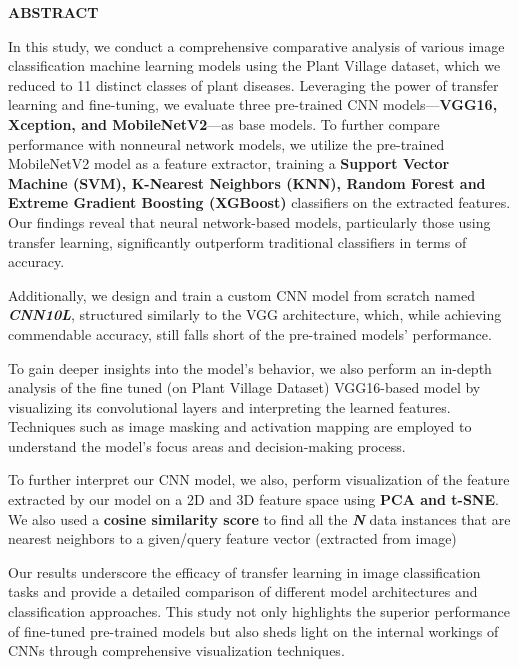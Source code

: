 \documentclass[12pt, oneside, a4paper]{book}
\begin{document}
\newpage
{}
\begingroup
    \begin{center}
        \LARGE \textbf{ABSTRACT}\\
    \end{center}
    \justifying
    \normalsize In this study, we conduct a comprehensive comparative analysis of various image classification machine learning models using the Plant Village dataset, which we reduced to 11 distinct classes of plant diseases. Leveraging the power of transfer learning and fine-tuning, we evaluate three pre-trained CNN models—\textbf{VGG16, Xception, and MobileNetV2}—as base models. To further compare performance with nonneural network models, we utilize the pre-trained MobileNetV2 model as a feature extractor, training a \textbf{Support Vector Machine (SVM), K-Nearest Neighbors (KNN), Random Forest and Extreme Gradient Boosting (XGBoost)} classifiers on the extracted features. Our findings reveal that neural network-based models, particularly those using transfer learning, significantly outperform traditional classifiers in terms of accuracy.\par \vspace{1em}
    Additionally, we design and train a custom CNN model from scratch named \textbf{\textit{CNN10L}}, structured similarly to the VGG architecture, which, while achieving commendable accuracy, still falls short of the pre-trained models' performance. \par \vspace{1em}
    To gain deeper insights into the model's behavior, we also perform an in-depth analysis of the fine tuned (on Plant Village Dataset) VGG16-based model by visualizing its convolutional layers and interpreting the learned features. Techniques such as image masking and activation mapping are employed to understand the model's focus areas and decision-making process.\par \vspace{1em}
    To further interpret our CNN model, we also, perform visualization of the feature extracted by our model on a 2D and 3D feature space using \textbf{PCA and t-SNE}. We also used a \textbf{cosine similarity score} to find all the \textbf{\textit{N}} data instances that are nearest neighbors to a given/query feature vector (extracted from image)
 \par\vspace{1em}
    Our results underscore the efficacy of transfer learning in image classification tasks and provide a detailed comparison of different model architectures and classification approaches. This study not only highlights the superior performance of fine-tuned pre-trained models but also sheds light on the internal workings of CNNs through comprehensive visualization techniques.\par\vspace{1em}
    
\end{document}
